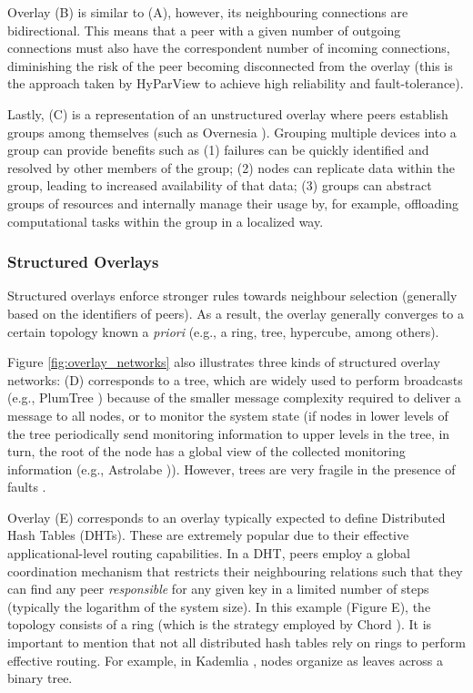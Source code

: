 Overlay (B) is similar to (A), however, its neighbouring connections are bidirectional. This means that a peer with a given number of outgoing connections must also have the correspondent number of incoming connections, diminishing the risk of the peer becoming disconnected from the overlay (this is the approach taken by HyParView \cite{Hyparview} to achieve high reliability and fault-tolerance).

Lastly, (C) is a representation of an unstructured overlay where peers establish groups among themselves (such as Overnesia \cite{leitao2014overnesia}). Grouping multiple devices into a group can provide benefits such as (1) failures can be quickly identified and resolved by other members of the group; (2) nodes can replicate data within the group, leading to increased availability of that data; (3) groups can abstract groups of resources and internally manage their usage by, for example, offloading computational tasks within the group in a localized way. 

\subsubsection*{Structured Overlays}

Structured overlays enforce stronger rules towards neighbour selection (generally based on the identifiers of peers). As a result, the overlay generally converges to a certain topology known a \textit{priori} (e.g., a ring, tree, hypercube, among others). 

Figure \ref{fig:overlay_networks} also illustrates three kinds of structured overlay networks: (D) corresponds to a tree, which are widely used to perform broadcasts (e.g., PlumTree \cite{plumTree}) because of the smaller message complexity required to deliver a message to all nodes, or to monitor the system state (if nodes in lower levels of the tree periodically send monitoring information \cite{leitao2008large} to upper levels in the tree, in turn, the root of the node has a global view of the collected monitoring information (e.g., Astrolabe \cite{Renesse2003})). However, trees are very fragile in the presence of faults \cite{plumTree}.

Overlay (E) corresponds to an overlay typically expected to define Distributed Hash Tables (DHTs). These are extremely popular due to their effective applicational-level routing capabilities. In a DHT, peers employ a global coordination mechanism that restricts their neighbouring relations such that they can find any peer \textit{responsible} for any given key in a  limited number of steps (typically the logarithm of the system size). In this example (Figure E), the topology consists of a ring (which is the strategy employed by Chord \cite{stoica2003chord}). It is important to mention that not all distributed hash tables rely on rings to perform effective routing. For example, in Kademlia \cite{maymounkov2002kademlia}, nodes organize as leaves across a binary tree.

